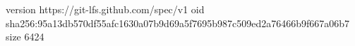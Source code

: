 version https://git-lfs.github.com/spec/v1
oid sha256:95a13db570df55afc1630a07b9d69a5f7695b987c509ed2a76466b9f667a06b7
size 6424
